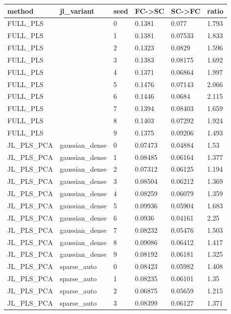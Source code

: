 {\def\LTcaptype{none} %
\begin{longtable}[]{@{}llllll@{}}
\toprule\noalign{}
method & jl\_variant & seed & FC-\textgreater SC & SC-\textgreater FC & ratio \\
\midrule\noalign{}
\endhead
\bottomrule\noalign{}
\endlastfoot
FULL\_PLS & & 0 & 0.1381 & 0.077 & 1.793 \\
FULL\_PLS & & 1 & 0.1381 & 0.07533 & 1.833 \\
FULL\_PLS & & 2 & 0.1323 & 0.0829 & 1.596 \\
FULL\_PLS & & 3 & 0.1383 & 0.08175 & 1.692 \\
FULL\_PLS & & 4 & 0.1371 & 0.06864 & 1.997 \\
FULL\_PLS & & 5 & 0.1476 & 0.07143 & 2.066 \\
FULL\_PLS & & 6 & 0.1446 & 0.0684 & 2.115 \\
FULL\_PLS & & 7 & 0.1394 & 0.08403 & 1.659 \\
FULL\_PLS & & 8 & 0.1403 & 0.07292 & 1.924 \\
FULL\_PLS & & 9 & 0.1375 & 0.09206 & 1.493 \\
JL\_PLS\_PCA & gaussian\_dense & 0 & 0.07473 & 0.04884 & 1.53 \\
JL\_PLS\_PCA & gaussian\_dense & 1 & 0.08485 & 0.06164 & 1.377 \\
JL\_PLS\_PCA & gaussian\_dense & 2 & 0.07312 & 0.06125 & 1.194 \\
JL\_PLS\_PCA & gaussian\_dense & 3 & 0.08504 & 0.06212 & 1.369 \\
JL\_PLS\_PCA & gaussian\_dense & 4 & 0.08259 & 0.06079 & 1.359 \\
JL\_PLS\_PCA & gaussian\_dense & 5 & 0.09936 & 0.05904 & 1.683 \\
JL\_PLS\_PCA & gaussian\_dense & 6 & 0.0936 & 0.04161 & 2.25 \\
JL\_PLS\_PCA & gaussian\_dense & 7 & 0.08232 & 0.05476 & 1.503 \\
JL\_PLS\_PCA & gaussian\_dense & 8 & 0.09086 & 0.06412 & 1.417 \\
JL\_PLS\_PCA & gaussian\_dense & 9 & 0.08192 & 0.06181 & 1.325 \\
JL\_PLS\_PCA & sparse\_auto & 0 & 0.08423 & 0.05982 & 1.408 \\
JL\_PLS\_PCA & sparse\_auto & 1 & 0.08235 & 0.06101 & 1.35 \\
JL\_PLS\_PCA & sparse\_auto & 2 & 0.06875 & 0.05659 & 1.215 \\
JL\_PLS\_PCA & sparse\_auto & 3 & 0.08399 & 0.06127 & 1.371 \\
\end{longtable}
}

